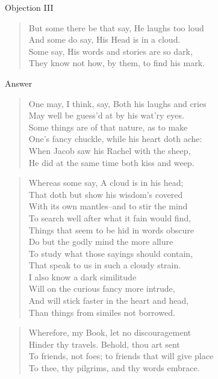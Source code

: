 Objection III
\begin{verse}
But some there be that say, He laughs too loud\\
And some do say, His Head is in a cloud.\\
Some say, His words and stories are so dark,\\
They know not how, by them, to find his mark.\\
\end{verse}
Answer
\begin{verse}
One may, I think, say, Both his laughs and cries\\
May well be guess'd at by his wat'ry eyes.\\
Some things are of that nature, as to make\\
One's fancy chuckle, while his heart doth ache:\\
When Jacob saw his Rachel with the sheep,\\
He did at the same time both kiss and weep.\\
\end{verse}
\begin{verse}
Whereas some say, A cloud is in his head;\\
That doth but show his wisdom's covered\\
With its own mantles--and to stir the mind\\
To search well after what it fain would find,\\
Things that seem to be hid in words obscure\\
Do but the godly mind the more allure\\
To study what those sayings should contain,\\
That speak to us in such a cloudy strain.\\
I also know a dark similitude\\
Will on the curious fancy more intrude,\\
And will stick faster in the heart and head,\\
Than things from similes not borrowed.\\
\end{verse}
\begin{verse}
Wherefore, my Book, let no discouragement\\
Hinder thy travels. Behold, thou art sent\\
To friends, not foes; to friends that will give place\\
To thee, thy pilgrims, and thy words embrace.\\
\end{verse}
